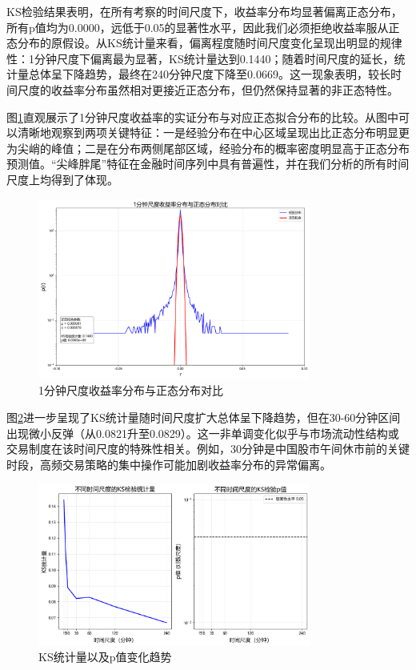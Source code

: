 \documentclass[12pt, a4paper]{article}
\begin{document}
KS检验结果表明，在所有考察的时间尺度下，收益率分布均显著偏离正态分布，所有p值均为0.0000，远低于0.05的显著性水平，因此我们必须拒绝收益率服从正态分布的原假设。从KS统计量来看，偏离程度随时间尺度变化呈现出明显的规律性：1分钟尺度下偏离最为显著，KS统计量达到0.1440；随着时间尺度的延长，统计量总体呈下降趋势，最终在240分钟尺度下降至0.0669。这一现象表明，较长时间尺度的收益率分布虽然相对更接近正态分布，但仍然保持显著的非正态特性。

图\ref{fig:normal_fit_1min}直观展示了1分钟尺度收益率的实证分布与对应正态拟合分布的比较。从图中可以清晰地观察到两项关键特征：一是经验分布在中心区域呈现出比正态分布明显更为尖峭的峰值；二是在分布两侧尾部区域，经验分布的概率密度明显高于正态分布预测值。“尖峰胖尾”特征在金融时间序列中具有普遍性，并在我们分析的所有时间尺度上均得到了体现。

\begin{figure}[htbp]
\centering
\includegraphics[width=0.8\textwidth]{../assets/img/1分钟尺度收益率分布与正太分布对比.png}
\caption{1分钟尺度收益率分布与正态分布对比}
\label{fig:normal_fit_1min}
\end{figure}

图\ref{fig:ks_statistics}进一步呈现了KS统计量随时间尺度扩大总体呈下降趋势，但在30-60分钟区间出现微小反弹（从0.0821升至0.0829）。这一非单调变化似乎与市场流动性结构或交易制度在该时间尺度的特殊性相关。例如，30分钟是中国股市午间休市前的关键时段，高频交易策略的集中操作可能加剧收益率分布的异常偏离。

\begin{figure}[htbp]
\centering
\includegraphics[width=0.8\textwidth]{../assets/img/不同时间尺度的KS检验统计量.png}
\caption{KS统计量以及p值变化趋势}
\label{fig:ks_statistics}
\end{figure}
\end{document}
